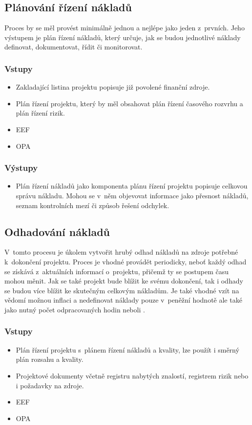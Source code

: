 \subsection*{Plánování řízení nákladů}

Proces by se měl provést minimálně jednou a nejlépe jako jeden z~prvních. Jeho výstupem je plán řízení nákladů, který určuje, jak se budou jednotlivé náklady definovat, dokumentovat, řídit či monitorovat.

\subsubsection*{Vstupy}
\begin{itemize}
    \item Zakladající listina projektu popisuje již povolené finanční zdroje.
    \item Plán řízení projektu, který by měl obsahovat plán řízení časového rozvrhu a plán řízení rizik.
    \item EEF
    \item OPA
\end{itemize}
\subsubsection*{Výstupy}
\begin{itemize}
    \item Plán řízení nákladů jako komponenta plánu řízení projektu popisuje celkovou správu nákladu. Mohou se v~něm objevovat informace jako přesnost nákladů, seznam kontrolních mezí či způsob řešení odchylek. 
\end{itemize}

\subsection*{Odhadování nákladů}

V~tomto procesu je úkolem vytvořit hrubý odhad nákladů na zdroje potřebné k~dokončení projektu. Proces je vhodné provádět periodicky, neboť každý odhad se získává z~aktuálních informací o~projektu, přičemž ty se postupem času mohou měnit. Jak se také projekt bude blížit ke svému dokončení, tak i odhady se budou více blížit ke skutečným celkovým nákladům. Je také vhodné vzít na vědomí možnou inflaci a nedefinovat náklady pouze v~peněžní hodnotě ale také jako nutný počet odpracovaných hodin neboli .


\subsubsection*{Vstupy}
\begin{itemize}
    \item Plán řízení projektu s~plánem řízení nákladů a kvality, lze použít i směrný plán rozsahu a kvality.
    \item Projektové dokumenty včetně registru nabytých znalostí, registrem rizik nebo i požadavky na zdroje.
    \item EEF
    \item OPA
\end{itemize}
